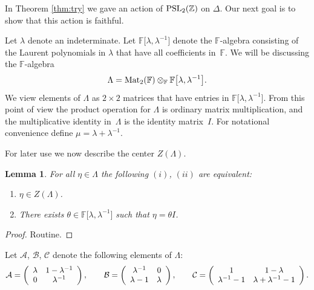 \documentclass[pdftex]{sigma}
\numberwithin{equation}{section}
\newtheorem{Lemma}[Theorem]{Lemma}
\begin{document}
In Theorem
\ref{thm:try}
we gave an
 action of ${\rm  {PSL}}_2(\mathbb Z)$  on $\Delta $.
Our next goal is to show that this
action is faithful.

Let $\lambda $ denote an indeterminate.
Let $\mathbb F\lbrack \lambda,\lambda^{-1}\rbrack$
denote the $\mathbb F$-algebra consisting of the Laurent
polynomials in $\lambda$ that have all coef\/f\/icients
in~$\mathbb F$.
We will be discussing the $\mathbb F$-algebra
\begin{gather*}
\Lambda ={\rm {Mat}}_2(\mathbb F) \otimes_{\mathbb F} \mathbb F\big\lbrack \lambda, \lambda^{-1}\big\rbrack.
\end{gather*}
We view elements of $\Lambda $ as $2\times 2$ matrices that have entries
in
$\mathbb F\lbrack \lambda, \lambda^{-1}\rbrack $.
From this point of view the product operation
for $\Lambda $ is ordinary matrix multiplication,
and the multiplicative identity in~$\Lambda $
is the identity matrix~$I$.
For notational convenience def\/ine
$\mu = \lambda + \lambda^{-1}$.


For later use we now describe the center $Z(\Lambda)$.{\samepage
\begin{Lemma}
\label{lem:zh}
For all $\eta \in \Lambda $ the following
$(i)$, $(ii)$
are equivalent:
\begin{enumerate}\itemsep=0pt
\item[$(i)$] $\eta  \in Z(\Lambda)$.
\item[$(ii)$] There exists $\theta \in
 \mathbb F\lbrack \lambda, \lambda^{-1} \rbrack $ such that $\eta=\theta I$.
\end{enumerate}
\end{Lemma}

\begin{proof}
Routine.
\end{proof}}



\begin{Definition}
\label{def:xyz}
Let $ \mathcal A$, $\mathcal B$, $\mathcal C$ denote the following elements of
$\Lambda $:
\begin{gather*}
 \mathcal A =
\left(
\begin{array}{  c c}
\lambda & 1-\lambda^{-1}   \\
0 & \lambda^{-1}
\end{array}
\right),
\qquad
\mathcal B =
\left(
\begin{array}{  c c}
\lambda^{-1} &  0 \\
\lambda-1 & \lambda
\end{array}
\right),
 \qquad \mathcal C =
\left(
\begin{array}{  c c}
1 &  1-\lambda \\
\lambda^{-1}-1 & \lambda+ \lambda^{-1}-1
\end{array}
\right).
\end{gather*}
\end{Definition}
\end{document}
